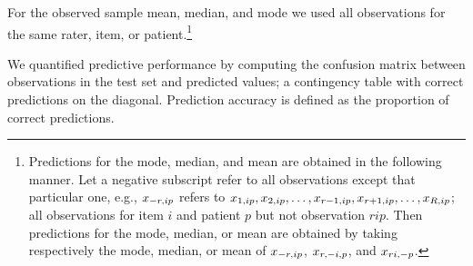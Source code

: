 \documentclass[a4paper,usenames,dvipsnames]{article}
\newenvironment{revision}{\color{black}}{\color{black}}
\begin{document}
\protect\begin{revision}For the observed sample mean, median, and mode we used all observations for the same rater, item, or patient.\protect\end{revision}\footnote{Predictions for the mode, median, and mean are obtained in the following manner. Let a negative subscript refer to all observations except that particular one, e.g., $x_{-r,ip}$ refers to $x_{1,\Iitem\Ipatient}, x_{2,\Iitem\Ipatient}, \dots, x_{\Irater-1,\Iitem\Ipatient},x_{\Irater+1,\Iitem\Ipatient}, \dots, x_{\Trater,\Iitem\Ipatient}$; all observations for item $i$ and patient $p$ but not observation $rip$. Then predictions for the mode\protect\begin{revision}, median, or mean\protect\end{revision} are obtained by taking \protect\begin{revision}respectively \protect\end{revision}the mode\protect\begin{revision}, median, or mean\protect\end{revision} of $x_{-r,ip}$, $x_{r,-i,p}$, and $x_{ri,-p}$.}

We quantified predictive performance by computing the confusion matrix between \protect\begin{revision}observations in the test set\protect\end{revision} and predicted values; a contingency table with correct predictions on the diagonal. Prediction accuracy is defined as the \protect\begin{revision}proportion of correct predictions\protect\end{revision}.
\end{document}
